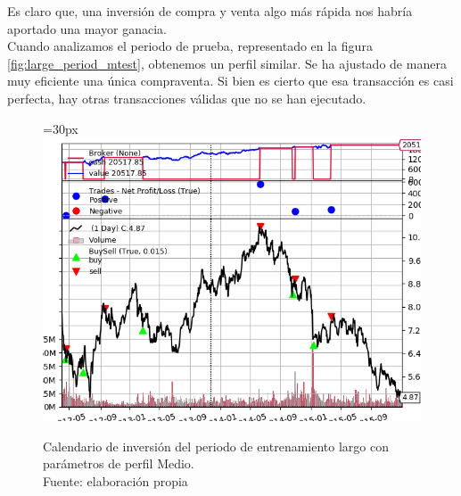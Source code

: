 Es claro que, una inversi\'on de compra y venta algo m\'as r\'apida nos habr\'ia aportado una mayor ganacia.\\

Cuando analizamos el periodo de prueba, representado en la figura \ref{fig:large_period_mtest}, obtenemos un perfil similar. Se ha ajustado de manera muy eficiente una \'unica compraventa. Si bien es cierto que esa transacci\'on es casi perfecta, hay otras transacciones v\'alidas que no se han ejecutado.

     	\begin{figure}[H]
     		\centering\leftskip=30px
     		\includegraphics[scale=0.72]{imagenes/L_Medium_train.png}
     		\caption[Calendario de inversi\'on del periodo de entrenamiento largo.]{Calendario de inversi\'on del periodo de entrenamiento largo con par\'ametros de perfil Medio.\\ Fuente: elaboraci\'on propia}
     		\label{fig:large_period_mtrain}
     	\end{figure}
     	
